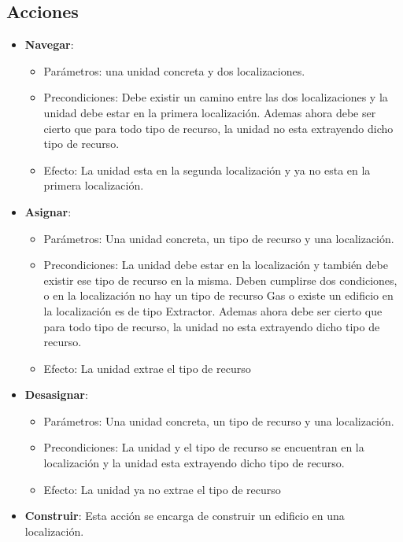 \subsection{Acciones}
\begin{itemize}
   \item \textbf{Navegar}:
      \begin{itemize}
         \item Parámetros: una unidad concreta y dos localizaciones.
         \item Precondiciones: Debe existir un camino entre las dos localizaciones y la unidad debe estar en la primera localización. Ademas ahora debe ser cierto que para todo tipo de recurso, la unidad no esta extrayendo dicho tipo de recurso.
         \item Efecto: La unidad esta en la segunda localización y ya no esta en la primera localización.
      \end{itemize}
   \item \textbf{Asignar}:
      \begin{itemize}
         \item Parámetros: Una unidad concreta, un tipo de recurso y una localización.
         \item Precondiciones: La unidad debe estar en la localización y también debe existir ese tipo de recurso en la misma. Deben cumplirse dos condiciones, o en la localización no hay un tipo de recurso Gas o existe un edificio en la localización es de tipo Extractor. Ademas ahora debe ser cierto que para todo tipo de recurso, la unidad no esta extrayendo dicho tipo de recurso.
         \item Efecto: La unidad extrae el tipo de recurso
      \end{itemize}
   \item \textbf{Desasignar}:
         \begin{itemize}
            \item Parámetros: Una unidad concreta, un tipo de recurso y una localización.
            \item Precondiciones: La unidad y el tipo de recurso se encuentran en la localización y la unidad esta extrayendo dicho tipo de recurso.
            \item Efecto: La unidad ya no extrae el tipo de recurso
         \end{itemize}
   \item \textbf{Construir}: Esta acción se encarga de construir un edificio en una localización.
      \begin{itemize}

\end{itemize}
\end{itemize}
